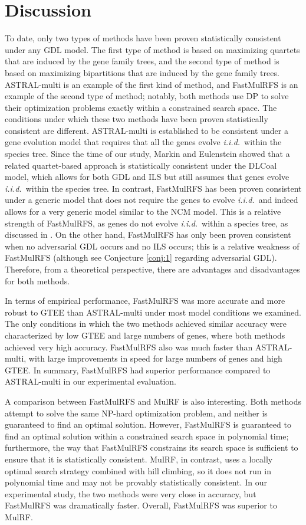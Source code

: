 \section{Discussion}
To date, only two types of methods have been proven statistically consistent under any GDL model.
The first type of method is based on maximizing quartets that are induced by the gene family trees, and the second type of method  is based on maximizing bipartitions that are induced by the gene family trees.
ASTRAL-multi is an example of the first kind of method, and FastMulRFS is an example of the second type of method; notably, both methods use DP to solve their optimization problems exactly within a constrained search space.
The conditions under which these two methods have been proven statistically consistent are different. 
ASTRAL-multi is established to be consistent under a gene evolution model that requires that all the genes evolve {\em i.i.d.}~within the species tree.
Since the time of our study, Markin and Eulenstein \cite{markin2020quartet} showed that a related quartet-based approach is statistically consistent under the DLCoal model, which allows for both GDL and ILS but still assumes that genes evolve {\em i.i.d.}~within the species tree.
In contrast, FastMulRFS has been proven consistent under a generic model that does not require the genes to evolve {\em i.i.d.}~and indeed allows for a very generic model similar to the NCM model.
This is a relative strength of FastMulRFS, as genes do not evolve {\em i.i.d.}~within a species tree, as discussed in \cite{dondi2019reconciling}.
On the other hand, FastMulRFS has only been proven consistent when no adversarial GDL occurs and no ILS occurs; this is a relative weakness of FastMulRFS (although see Conjecture \ref{conj:1} regarding adversarial GDL).
Therefore, from a theoretical perspective, there are advantages and disadvantages for both methods.

In terms of empirical performance, FastMulRFS was more accurate and more robust to GTEE than ASTRAL-multi under most model conditions we examined.
The only conditions in which the two methods achieved similar accuracy were characterized by low GTEE and large numbers of genes, where both methods achieved very high accuracy.
FastMulRFS also was much faster than ASTRAL-multi, with large improvements in speed for large numbers of genes and high GTEE.
In summary, FastMulRFS had superior performance compared to ASTRAL-multi in our experimental evaluation.

A comparison between FastMulRFS and MulRF is also interesting.
Both methods attempt to solve the same NP-hard optimization problem, and neither is guaranteed to find an optimal solution. 
However, FastMulRFS is guaranteed to find an optimal solution within a constrained search space in polynomial time; furthermore, the way that FastMulRFS constrains its search space is sufficient to ensure that it is statistically consistent.
MulRF, in contrast, uses a locally optimal search strategy combined with hill climbing, so it does not run in polynomial time and may not be provably statistically consistent.
In our experimental study, the two methods were very close in accuracy, but FastMulRFS was dramatically faster. 
Overall, FastMulRFS was superior to MulRF.

